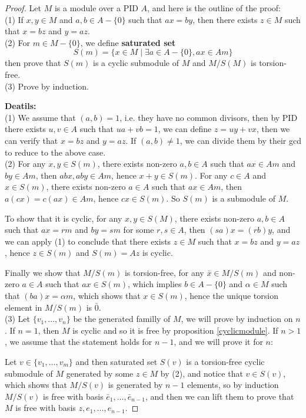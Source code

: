 \documentclass[12pt,a4paper]{article}
\begin{document}
\begin{proof}
        Let \(M\) is a module over a PID \(A\), and here is the outline of the proof:\\
        (1) If \(x,y \in M\) and \(a,b \in A -\{0\}\) such that \(ax=by\), then there exists \(z \in M\) such that \(x = bz\) and \(y = az\).\\
        (2) For \(m \in M- \{0\}\), we define \textbf{saturated set}
        \[S(m) = \{x \in M \mid \exists a \in A-\{0\},ax \in Am\}\]
        then prove that \(S(m)\) is a cyclic submodule of \(M\) and \(M/S(M)\) is torsion-free.\\
        (3) Prove by induction.

        \textbf{Deatils:}\\

        (1) We assume that \((a,b)=1\), i.e. they have no common divisors, then by PID there exists \(u,v \in A\) such that \(ua+vb=1\), we can define \(z = uy+vx\), then we can verify that \(x = bz\) and \(y = az\). If \((a,b) \neq 1\), we can divide them by their gcd to reduce to the above case.\\

        (2) For any \(x,y \in S(m)\), there exists non-zero \(a,b \in A\) such that \(ax \in Am\) and \(by \in Am\), then \(abx,aby \in Am\), hence \(x+y \in S(m)\). For any \(c \in A\) and \(x \in S(m)\), there exists non-zero \(a \in A\) such that \(ax \in Am\), then \(a(cx) = c(ax) \in Am\), hence \(cx \in S(m)\). So \(S(m)\) is a submodule of \(M\). 
        
        To show that it is cyclic, for any \(x,y \in S(M)\), there exists non-zero \(a,b \in A\) such that \(ax = rm\) and \(by = sm\) for some \(r,s \in A\), then \((sa)x = (rb)y\), and we can apply (1) to conclude that there exists \(z \in M\) such that \(x = bz\) and \(y = az\), hence \(z \in S(m)\) and \(S(m) = Az\) is cyclic. 
        
        Finally we show that \(M/S(m)\) is torsion-free, for any \(\bar{x} \in M/S(m)\) and non-zero \(a \in A\) such that \(ax \in S(m)\), which implies \(b \in A-\{0\}\) and \(\alpha \in M\) such that \((ba)x = \alpha m\), which shows that \(x \in S(m)\), hence the unique torsion element in \(M/S(m)\) is \(\bar{0}\).\\

        (3) Let \(\{v_1,...,v_n\}\) be the generated familly of \(M\), we will prove by induction on \(n\). If \(n=1\), then \(M\) is cyclic and so it is free by proposition \ref{cyclicmodule}. If \(n>1\), we assume that the statement holds for \(n-1\), and we will prove it for \(n\): 
        
        Let \(v \in \{v_1,\dots,v_m\}\) and then saturated set \(S(v)\) is a torsion-free cyclic submodule of \(M\) generated by some \(z \in M\) by (2), and notice that \(v \in S(v)\), which shows that \(M/S(v)\) is generated by \(n-1\) elements, so by induction \(M/S(v)\) is free with basis \(\bar{e}_1,\dots,\bar{e}_{n-1}\), and then we can lift them to prove that \(M\) is free with basis \(z,e_1,\dots,e_{n-1}\).
\end{proof}
\end{document}
